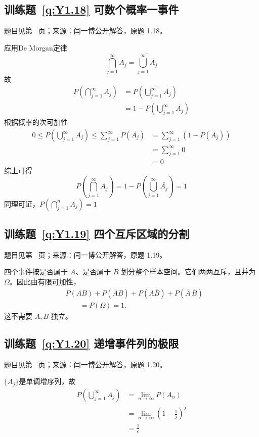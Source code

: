 \documentclass[UTF8,12pt,a4paper,fontset=fandol]{ctexbook}
\begin{document}
\subsection*{训练题~\ref{q:Y1.18} 可数个概率一事件}\label{a:Y1.18}{\small 题目见第~\pageref{q:Y1.18} 页；来源：闫一博公开解答，原题 1.18。}
\begin{solve}
应用De Morgan定律
\[\bigcap\limits_{j = 1}^\infty  {{A_j}}  = \overline {\bigcup\limits_{j = 1}^\infty  {\overline {{A_j}} } } \]
故
\[\begin{aligned}P(\bigcap\limits_{j = 1}^\infty  {{A_j}} ) &= P(\overline {\bigcup\limits_{j = 1}^\infty  {\overline {{A_j}} } } ) \\&= 1 - P(\bigcup\limits_{j = 1}^\infty  {\overline {{A_j}} } )\end{aligned}\]
根据概率的次可加性
\[\begin{aligned}0 \leqslant P(\bigcup\limits_{j = 1}^\infty  {\overline {{A_j}} } ) \leqslant \sum\limits_{j = 1}^\infty  {P(\overline {{A_j}} )}  &= \sum\limits_{j = 1}^\infty  {(1 - P({A_j}))}  \\&= \sum\limits_{j = 1}^\infty  0\\&=0 \end{aligned}\]
综上可得
\[P(\bigcap\limits_{j = 1}^\infty  {{A_j}} ) = 1 - P(\bigcup\limits_{j = 1}^\infty  {\overline {{A_j}} } ) = 1\]
同理可证，$P(\bigcap\limits_{j = 1}^n {{A_j}} ) = 1$
\end{solve}

\subsection*{训练题~\ref{q:Y1.19} 四个互斥区域的分割}\label{a:Y1.19}{\small 题目见第~\pageref{q:Y1.19} 页；来源：闫一博公开解答，原题 1.19。}
\begin{solve}四个事件按是否属于 $A$、是否属于 $B$ 划分整个样本空间。它们两两互斥，且并为 $\Omega$。因此由有限可加性，\[\begin{aligned}&P(AB)+P(\overline AB)+P(A\overline B)+P(\overline A\,\overline B)\\&\qquad=P(\Omega)=1.\end{aligned}\]这不需要 $A,B$ 独立。\end{solve}

\subsection*{训练题~\ref{q:Y1.20} 递增事件列的极限}\label{a:Y1.20}{\small 题目见第~\pageref{q:Y1.20} 页；来源：闫一博公开解答，原题 1.20。}
\begin{solve}
$\{A_j\}$是单调增序列，故
\[\begin{aligned}
P(\bigcup\limits_{j = 1}^\infty  {{A_j}} ) &= \mathop {\lim }\limits_{n \to \infty } P({A_n}) \\&= \mathop {\lim }\limits_{n \to \infty } {(1 - \frac{1}{j})^j} \\&= \frac{1}{e}
\end{aligned}\]
\end{solve}
\end{document}
